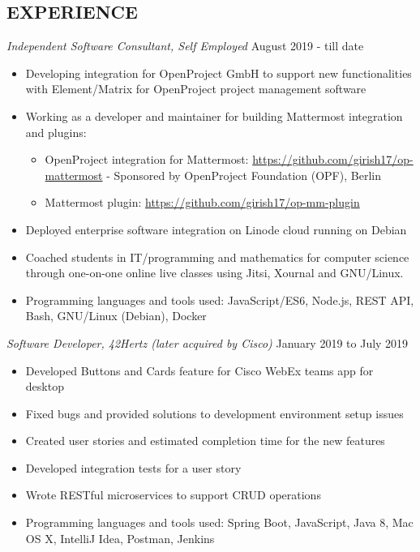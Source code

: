 \documentclass[line, margin]{res}
\begin{document}
\begin{resume}
  \section{EXPERIENCE}
  \textit{Independent Software Consultant, Self Employed} \hfill
  August 2019 - till date \\
  \begin{itemize}
  \item Developing integration for OpenProject GmbH to support new functionalities with Element/Matrix for OpenProject project management software
  \item Working as a developer and maintainer for
    building Mattermost integration and plugins:
    \begin{itemize}
    \item OpenProject integration for Mattermost: \url{https://github.com/girish17/op-mattermost} - Sponsored by OpenProject Foundation (OPF), Berlin
    \item Mattermost plugin: \url{https://github.com/girish17/op-mm-plugin}
    \end{itemize}
  \item Deployed enterprise software integration on Linode cloud
    running on Debian
  \item Coached students in IT/programming and mathematics for
    computer science through one-on-one online live classes using Jitsi, Xournal and GNU/Linux.
  \item Programming languages and tools used: JavaScript/ES6, Node.js, REST API,
    Bash, GNU/Linux (Debian), Docker
  \end{itemize}
  \textit{Software Developer, 42Hertz (later acquired by Cisco)} \hfill January 2019 to July 2019 \\
  \begin{itemize}
  \item Developed Buttons and Cards feature for Cisco WebEx teams app for desktop
  \item Fixed bugs and provided solutions to development environment setup issues
  \item Created user stories and estimated completion time for the new features
  \item Developed integration tests for a user story
  \item Wrote RESTful microservices to support CRUD operations
  \item Programming languages and tools used: Spring Boot, JavaScript, Java 8, Mac OS X,
    IntelliJ Idea, Postman, Jenkins
  \end{itemize}

\end{resume}
\end{document}
